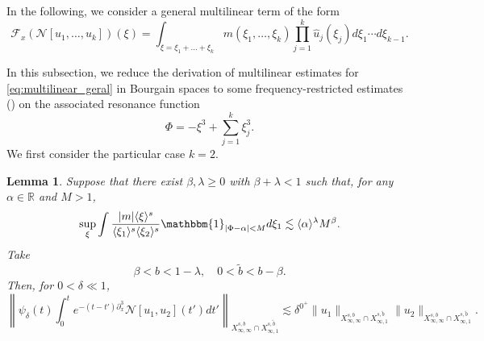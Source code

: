\documentclass[%
11pt,  reqno]{amsart}
\newcommand{\jap}[1]{\langle #1 \rangle}
\newcommand{\5}{\textup{V}}
\newcommand{\ft}{\widehat}
\newcommand{\les}{\lesssim}
\newtheorem{lemma}[theorem]{Lemma}
\theoremstyle{remark}
\newcommand{\R}{\mathbb{R}}
\newcommand{\Ft}{{\mathcal{F}}}
\numberwithin{equation}{section}
\numberwithin{theorem}{section}
\begin{document}
	
	{
		
		In the following, we consider a general multilinear term of the form
		\begin{equation}\label{eq:multilinear_geral}
			\Ft_x (\mathcal{N}[u_1,\dots, u_k])(\xi)=\int_{\xi=\xi_1+\dots+\xi_k} m(\xi_1,\dots,\xi_k)\prod_{j=1}^k\ft{u}_j(\xi_j) d\xi_1\cdots d\xi_{k-1}.
		\end{equation}
        
		In this subsection, we reduce the derivation of multilinear estimates for \eqref{eq:multilinear_geral} in Bourgain spaces to some frequency-restricted estimates (\cite{COS}) on the associated resonance function
        $$
        \Phi=-\xi^3+\sum_{j=1}^k\xi_j^3.
        $$
		We first consider the particular case $k=2$. 
		
		\begin{lemma}\label{lem:reduction_fre_k2}
			Suppose that there exist $\beta,\lambda\ge 0$ with $\beta+\lambda<1$ such that, for any $\alpha\in \R$ and $M>1$,
			\begin{equation}\label{fre}
				\sup_{\xi} \int \frac{|m|\jap{\xi}^s}{\jap{\xi_1}^s\jap{\xi_2}^s} \mathbbm{1}_{|\Phi-\alpha|<M} d\xi_1 \lesssim \jap{\alpha}^\lambda M^\beta.
			\end{equation}
            Take
            $$
            \beta<b<1-\lambda,\quad 0<\tilde{b}<b-\beta.
            $$
Then, for $0<\delta\ll 1$,
\begin{equation}\label{eq:bilin_infty}
    \left\|\psi_\delta(t)\int_0^t e^{-(t-t')\partial_x^3}\mathcal{N}[u_1,u_2](t')dt' \right\|_{X^{s,b}_{\infty, \infty} \cap X^{s,\tilde{b}}_{\infty,1}}  \les \delta^{0^+}\|u_1\|_{X^{s,b}_{\infty, \infty} \cap X^{s,\tilde{b}}_{\infty,1}}\|u_2\|_{X^{s,b}_{\infty, \infty} \cap X^{s,\tilde{b}}_{\infty,1}}.
\end{equation}
            

\end{lemma}}
\end{document}
